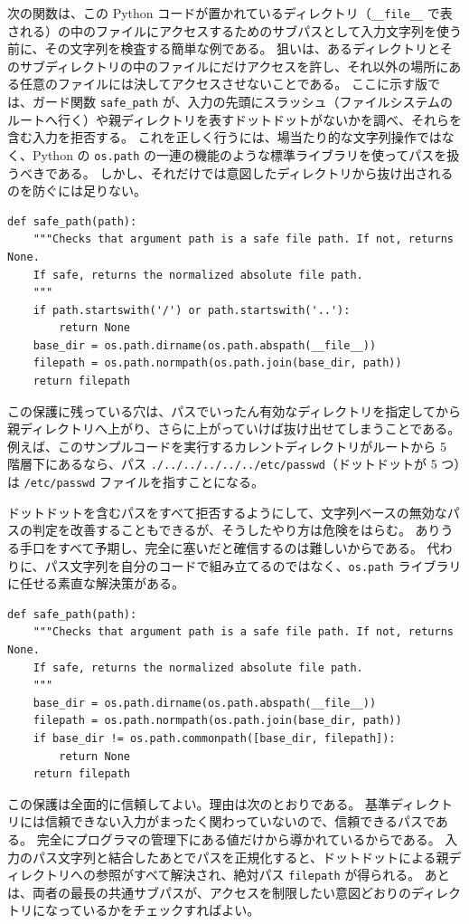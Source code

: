 \documentclass[uplatex]{jsarticle}
\def\label#1{}%
\begin{document}
\begin{exa}\label{exa:ch10-safe-path-insufficient}
次の関数は、この Python コードが置かれているディレクトリ（\texttt{\_\_file\_\_} で表される）の中のファイルにアクセスするためのサブパスとして入力文字列を使う前に、その文字列を検査する簡単な例である。
狙いは、あるディレクトリとそのサブディレクトリの中のファイルにだけアクセスを許し、それ以外の場所にある任意のファイルには決してアクセスさせないことである。
ここに示す版では、ガード関数 \texttt{safe\_path} が、入力の先頭にスラッシュ（ファイルシステムのルートへ行く）や親ディレクトリを表すドットドットがないかを調べ、それらを含む入力を拒否する。
これを正しく行うには、場当たり的な文字列操作ではなく、Python の \texttt{os.path} の一連の機能のような標準ライブラリを使ってパスを扱うべきである。
しかし、それだけでは意図したディレクトリから抜け出されるのを防ぐには足りない。
\begin{verbatim}
def safe_path(path):
    """Checks that argument path is a safe file path. If not, returns None.
    If safe, returns the normalized absolute file path.
    """
    if path.startswith('/') or path.startswith('..'):
        return None
    base_dir = os.path.dirname(os.path.abspath(__file__))
    filepath = os.path.normpath(os.path.join(base_dir, path))
    return filepath
\end{verbatim}
この保護に残っている穴は、パスでいったん有効なディレクトリを指定してから親ディレクトリへ上がり、さらに上がっていけば抜け出せてしまうことである。
例えば、このサンプルコードを実行するカレントディレクトリがルートから 5 階層下にあるなら、パス \verb|./../../../../../etc/passwd|（ドットドットが 5 つ）は \verb|/etc/passwd| ファイルを指すことになる。
\end{exa}

ドットドットを含むパスをすべて拒否するようにして、文字列ベースの無効なパスの判定を改善することもできるが、そうしたやり方は危険をはらむ。
ありうる手口をすべて予期し、完全に塞いだと確信するのは難しいからである。
代わりに、パス文字列を自分のコードで組み立てるのではなく、\texttt{os.path} ライブラリに任せる素直な解決策がある。

\begin{exa}\label{exa:ch10-safe-path}
\begin{verbatim}
def safe_path(path):
    """Checks that argument path is a safe file path. If not, returns None.
    If safe, returns the normalized absolute file path.
    """
    base_dir = os.path.dirname(os.path.abspath(__file__))
    filepath = os.path.normpath(os.path.join(base_dir, path))
    if base_dir != os.path.commonpath([base_dir, filepath]):
        return None
    return filepath
\end{verbatim}
この保護は全面的に信頼してよい。理由は次のとおりである。
基準ディレクトリには信頼できない入力がまったく関わっていないので、信頼できるパスである。
完全にプログラマの管理下にある値だけから導かれているからである。
入力のパス文字列と結合したあとでパスを正規化すると、ドットドットによる親ディレクトリへの参照がすべて解決され、絶対パス \texttt{filepath} が得られる。
あとは、両者の最長の共通サブパスが、アクセスを制限したい意図どおりのディレクトリになっているかをチェックすればよい。
\end{exa}
\end{document}
